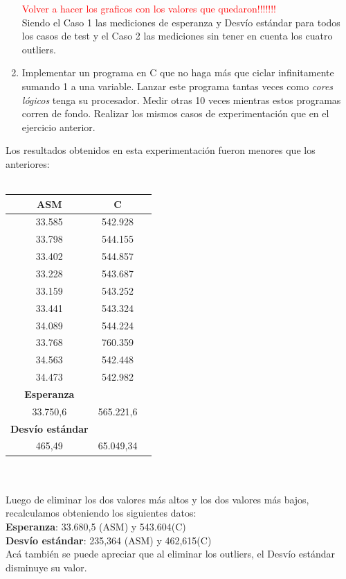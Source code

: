 \begin{enumerate}
\textcolor{red}{Volver a hacer los graficos con los valores que quedaron!!!!!!!}\\
\indent Siendo el Caso 1 las mediciones de esperanza y Desvío est\'andar para todos los casos de test y el Caso 2 las mediciones sin tener en cuenta los cuatro outliers.\\

\bigskip
    \item Implementar un programa en C que no haga más que ciclar infinitamente sumando 1 a una variable. Lanzar este programa tantas veces como \emph{cores lógicos} tenga su procesador. Medir otras 10 veces mientras estos programas corren de fondo. Realizar los mismos casos de experimentaci\'on que en el ejercicio anterior.\\
\end{enumerate}
Los resultados obtenidos en esta experimentaci\'on fueron menores que los anteriores: \\
\\       
        \begin{tabular}[c]{|c|c|c|}
	\hline
		\textbf{ASM} & \textbf{C}\\
		\hline
33.585 &	542.928 \\
\hline
33.798 &	544.155 \\
\hline
33.402 &	544.857 \\
\hline
33.228 &	543.687 \\
\hline
33.159 &	543.252 \\
\hline
33.441 &	543.324 \\
\hline
34.089 &	544.224 \\ 
\hline
33.768 &	760.359 \\ 
\hline
34.563 &	542.448 \\
\hline
34.473 &	542.982 \\
\hline
		\textbf{Esperanza}	\\
		\hline
33.750,6 & 565.221,6	\\		
		\hline
		\textbf{Desvío est\'andar}	\\
		\hline
465,49 & 65.049,34\\
		\hline
	\end{tabular}\\\\
	Luego de eliminar los dos valores m\'as altos y los dos valores m\'as bajos, recalculamos obteniendo los siguientes datos: \\
	\textbf{Esperanza}: 33.680,5 (ASM) y 543.604(C)\\
	\textbf{Desvío est\'andar}:	235,364 (ASM) y 462,615(C)\\
	Ac\'a tambi\'en se puede apreciar que al eliminar los outliers, el Desvío est\'andar disminuye su valor. \\

